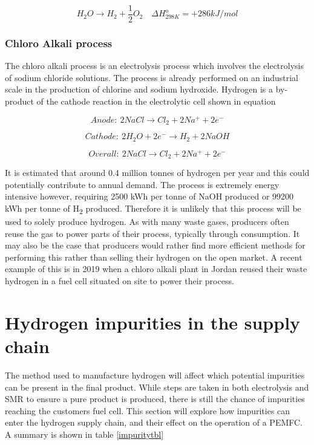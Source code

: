 \begin{equation}\label{thermdec}
    H_2 O \rightarrow H_2 + \frac{1}{2} O_2  \quad \Delta H_{298K}^o = +286 kJ/mol
\end{equation}

\subsubsection*{Chloro Alkali process}
The chloro alkali process is an electrolysis process which involves the electrolysis of sodium chloride solutions. The process is already performed on an industrial scale in the production of chlorine and sodium hydroxide. Hydrogen is a by-product of the cathode reaction in the electrolytic cell shown in equation \label{cathode}

\begin{equation}\label{anode}
    Anode:\: 2NaCl \rightarrow Cl_2 + 2Na^+ + 2e^-
\end{equation}


\begin{equation}\label{cathode}
    Cathode:\: 2H_2O + 2e^- \rightarrow H_2 + 2NaOH
\end{equation}

\begin{equation}\label{overall}
    Overall:\: 2NaCl \rightarrow Cl_2 + 2Na^+ + 2e^-
\end{equation}

It is estimated that around 0.4 million tonnes of hydrogen per year and this could potentially contribute to annual demand. \cite{argonnenationallab_2017} The process is extremely energy intensive however, requiring 2500 kWh per tonne of NaOH produced or 99200 kWh per tonne of H\textsubscript{2} produced. \cite{doi:10.1021/ed057pA270.1} Therefore it is unlikely that this process will be used to solely produce hydrogen. As with many waste gases, producers often reuse the gas to power parts of their process, typically through consumption. It may also be the case that producers would rather find more efficient methods for performing this rather than selling their hydrogen on the open market. A recent example of this is in 2019 when a chloro alkali plant in Jordan reused their waste hydrogen in a fuel cell situated on site to power their process. \cite{doi:10.1177/0144598719839767}

\section{Hydrogen impurities in the supply chain}
The method used to manufacture hydrogen will affect which potential impurities can be present in the final product. While steps are taken in both electrolysis and SMR to ensure a pure product is produced, there is still the chance of impurities reaching the customers fuel cell. This section will explore how impurities can enter the hydrogen supply chain, and their effect on the operation of a PEMFC. A summary is shown in table \ref{impuritytbl}

